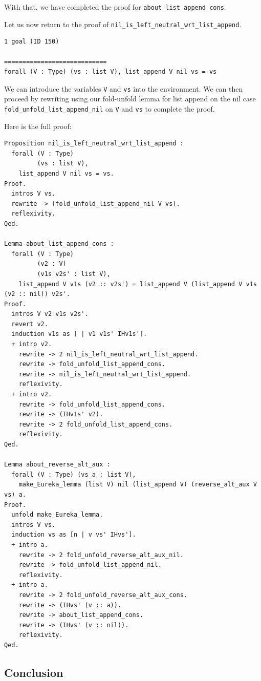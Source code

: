 \documentclass{article}
\begin{document}
With that, we have completed the proof for \texttt{about\_list\_append\_cons}.

Let us now return to the proof of \texttt{nil\_is\_left\_neutral\_wrt\_list\_append}. 

\begin{lstlisting}
1 goal (ID 150)

============================
forall (V : Type) (vs : list V), list_append V nil vs = vs
\end{lstlisting}

We can introduce the variables \texttt{V} and \texttt{vs} into the environment. We can then proceed by rewriting using our fold-unfold lemma for list append on the nil case \texttt{fold\_unfold\_list\_append\_nil} on \texttt{V} and \texttt{vs} to complete the proof.

Here is the full proof:

\begin{lstlisting}
Proposition nil_is_left_neutral_wrt_list_append :
  forall (V : Type)
         (vs : list V),
    list_append V nil vs = vs.
Proof.
  intros V vs.
  rewrite -> (fold_unfold_list_append_nil V vs).
  reflexivity.
Qed.

Lemma about_list_append_cons :
  forall (V : Type)
         (v2 : V)
         (v1s v2s' : list V),
    list_append V v1s (v2 :: v2s') = list_append V (list_append V v1s (v2 :: nil)) v2s'.
Proof.
  intros V v2 v1s v2s'.
  revert v2.
  induction v1s as [ | v1 v1s' IHv1s'].
  + intro v2.
    rewrite -> 2 nil_is_left_neutral_wrt_list_append.
    rewrite -> fold_unfold_list_append_cons.
    rewrite -> nil_is_left_neutral_wrt_list_append.
    reflexivity.
  + intro v2.
    rewrite -> fold_unfold_list_append_cons.
    rewrite -> (IHv1s' v2).
    rewrite -> 2 fold_unfold_list_append_cons.
    reflexivity.
Qed.
    
Lemma about_reverse_alt_aux :
  forall (V : Type) (vs a : list V),
    make_Eureka_lemma (list V) nil (list_append V) (reverse_alt_aux V vs) a.
Proof.
  unfold make_Eureka_lemma.
  intros V vs.
  induction vs as [n | v vs' IHvs'].
  + intro a.
    rewrite -> 2 fold_unfold_reverse_alt_aux_nil.
    rewrite -> fold_unfold_list_append_nil.
    reflexivity.
  + intro a.
    rewrite -> 2 fold_unfold_reverse_alt_aux_cons.
    rewrite -> (IHvs' (v :: a)).
    rewrite -> about_list_append_cons.
    rewrite -> (IHvs' (v :: nil)).
    reflexivity.
Qed.  
\end{lstlisting}

\subsection{Conclusion}
\end{document}

